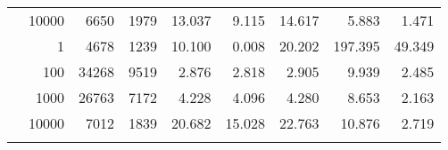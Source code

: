 \begin{table}
\begin{tabular}{rrrrrrrrr}
	            
					 &  
					 
					\multirow{ 1 }{*}{ 10000 } &
					
						
							    
							     6650  & 1979  
	                           & 13.037 & 9.115 & 14.617
	                           & 5.883 & 1.471  \\
	                
	            
	        
				\noalign{\smallskip}\hline
				\multirow{ 4 }{*}{ 500000 } &
				
					
					 
					\multirow{ 1 }{*}{ 1 } &
					
						
							    
							     4678  & 1239  
	                           & 10.100 & 0.008 & 20.202
	                           & 197.395 & 49.349  \\
	                
	            
					 &  
					 
					\multirow{ 1 }{*}{ 100 } &
					
						
							    
							     34268  & 9519  
	                           & 2.876 & 2.818 & 2.905
	                           & 9.939 & 2.485  \\
	                
	            
					 &  
					 
					\multirow{ 1 }{*}{ 1000 } &
					
						
							    
							     26763  & 7172  
	                           & 4.228 & 4.096 & 4.280
	                           & 8.653 & 2.163  \\
	                
	            
					 &  
					 
					\multirow{ 1 }{*}{ 10000 } &
					
						
							    
							     7012  & 1839  
	                           & 20.682 & 15.028 & 22.763
	                           & 10.876 & 2.719  \\
	                
	            
	        
				\noalign{\smallskip}\hline
				\multirow{ 4 }{*}{ 1000000 } &
				

\end{tabular}
\end{table}
